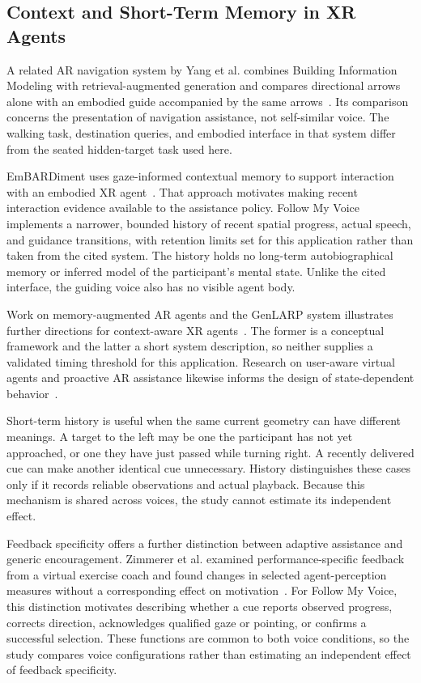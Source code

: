 \subsection{Context and Short-Term Memory in XR Agents}
A related AR navigation system by Yang et al. combines Building Information Modeling with retrieval-augmented generation and compares directional arrows alone with an embodied guide accompanied by the same arrows~\cite{yang2025embodiednavigation}. Its comparison concerns the presentation of navigation assistance, not self-similar voice. The walking task, destination queries, and embodied interface in that system differ from the seated hidden-target task used here.

EmBARDiment uses gaze-informed contextual memory to support interaction with an embodied XR agent~\cite{bovo2025embardiment}. That approach motivates making recent interaction evidence available to the assistance policy. Follow My Voice implements a narrower, bounded history of recent spatial progress, actual speech, and guidance transitions, with retention limits set for this application rather than taken from the cited system. The history holds no long-term autobiographical memory or inferred model of the participant's mental state. Unlike the cited interface, the guiding voice also has no visible agent body.

Work on memory-augmented AR agents and the GenLARP system illustrates further directions for context-aware XR agents~\cite{choi2025memory,yu2025genlarp}. The former is a conceptual framework and the latter a short system description, so neither supplies a validated timing threshold for this application. Research on user-aware virtual agents and proactive AR assistance likewise informs the design of state-dependent behavior~\cite{gunawardhana2024useraware,li2025satori}.

Short-term history is useful when the same current geometry can have different meanings. A target to the left may be one the participant has not yet approached, or one they have just passed while turning right. A recently delivered cue can make another identical cue unnecessary. History distinguishes these cases only if it records reliable observations and actual playback. Because this mechanism is shared across voices, the study cannot estimate its independent effect.

Feedback specificity offers a further distinction between adaptive assistance and generic encouragement. Zimmerer et al. examined performance-specific feedback from a virtual exercise coach and found changes in selected agent-perception measures without a corresponding effect on motivation~\cite{zimmerer2025feedback}. For Follow My Voice, this distinction motivates describing whether a cue reports observed progress, corrects direction, acknowledges qualified gaze or pointing, or confirms a successful selection. These functions are common to both voice conditions, so the study compares voice configurations rather than estimating an independent effect of feedback specificity.

